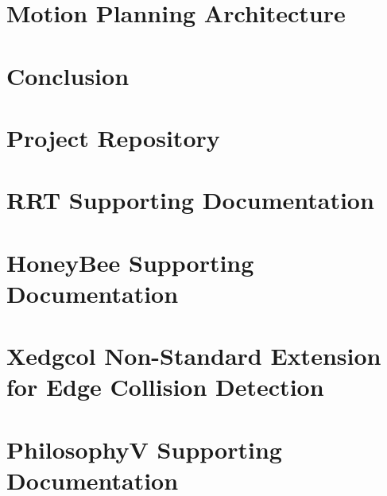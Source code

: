 \documentclass[
    11pt,           %
    letterpaper,    %
    oneside         %
]{report}           %
\begin{document}
\chapter{Motion Planning Architecture}
    \label{chap:MotionPlaningArchitecture}
    

\chapter{Conclusion}
    

\begin{appendices}

\chapter{Project Repository}
    \label{appendix:repository}
    

\chapter{RRT Supporting Documentation}
    \label{appendix:rrt_appendix}
    

\chapter{HoneyBee Supporting Documentation}
    \label{appendix:honeybee_appendix}
    

\chapter{Xedgcol Non-Standard Extension for Edge Collision Detection}
    \label{appendix:xedgcol_appendix}
    

\chapter{PhilosophyV Supporting Documentation}
    \label{appendix:philv_appendix}
    

\end{appendices} 




\clearpage 
\newpage


\end{document}
